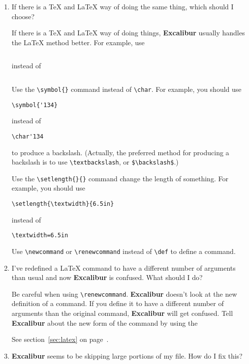 \documentclass[11pt,titlepage]{article}
\newcommand{\ex}{\textbf{Excalibur}}
\begin{document}
\begin{enumerate}

\item If there is a \TeX{} and \LaTeX{} way of doing the same thing,
  which should I choose?

  If there is a \TeX{} and \LaTeX{} way of doing things, \ex{} usually
  handles the \LaTeX{} method better. For example, use
\begin{verbatim}

\end{verbatim}
  instead of
\begin{verbatim}

\end{verbatim}

  Use the \verb+\symbol{}+ command instead of \verb+\char+. For
  example, you should use
\begin{verbatim}
\symbol{'134}
\end{verbatim}
  instead of
\begin{verbatim}
\char'134
\end{verbatim}
  to produce a backslash.  (Actually, the preferred method for producing
  a backslash is to use \verb+\textbackslash+, or \verb+$\backslash$+.)

  Use the \verb+\setlength{}{}+ command change the length of
  something. For example, you should use
\begin{verbatim}
\setlength{\textwidth}{6.5in}
\end{verbatim}
  instead of
\begin{verbatim}
\textwidth=6.5in
\end{verbatim}

  Use \verb+\newcommand+ or \verb+\renewcommand+ instead of
  \verb+\def+ to define a command.

\item I've redefined a \LaTeX{} command to have a different number of
  arguments than usual and now \ex{} is confused.  What should I do?

  Be careful when using \verb+\renewcommand+. \ex{} doesn't look at
  the new definition of a command. If you define it to have a
  different number of arguments than the original command, \ex{} will
  get confused.  Tell \ex{} about the new form of the command by using
  the 
  \begin{latexonly}
    See section~\ref{sec:latex} on
    page~\pageref{sec:latex}.
  \end{latexonly}

\item \ex{} seems to be skipping large portions of my file.  How do I
  fix this?


\end{enumerate}
\end{document}
